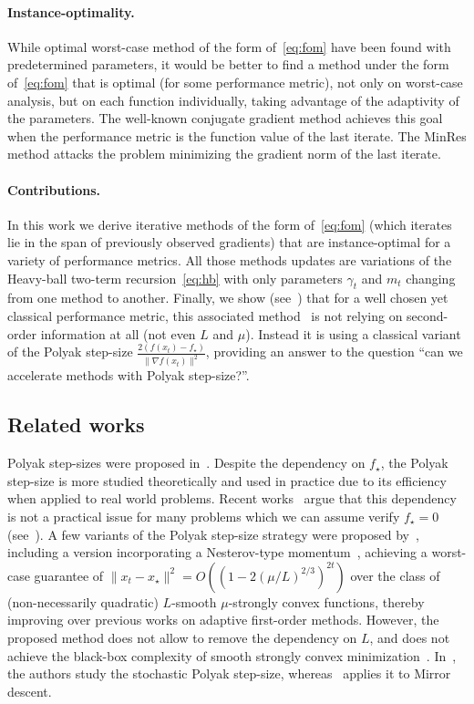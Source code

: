 \documentclass{article}
\newcommand{\xs}{x_\star}
\begin{document}
    \paragraph{Instance-optimality.}
    While optimal worst-case method of the form of~\cref{eq:fom} have been found with predetermined parameters,
    it would be better to find a method under the form of~\cref{eq:fom} that is optimal (for some performance metric),
    not only on worst-case analysis, but on each function individually, taking advantage of the adaptivity of the parameters.
    The well-known conjugate gradient method achieves this goal when the performance metric is the function value of the last iterate.
    The MinRes method attacks the problem minimizing the gradient norm of the last iterate.

    \paragraph{Contributions.}
    In this work we derive iterative methods of the form of~\cref{eq:fom} (which iterates lie in the span of previously observed gradients) that are instance-optimal for a variety of performance metrics.
    All those methods updates are variations of the Heavy-ball two-term recursion~\cref{eq:hb} with only parameters $\gamma_t$ and $m_t$ changing from one method to another.
    Finally, we show (see~) that for a well chosen yet classical performance metric, this associated method~ is not relying on second-order information at all (not even $L$ and $\mu$).
    Instead it is using a classical variant of the Polyak step-size $\frac{2(f(x_t) - f_\star)}{\|\nabla f(x_t)\|^2}$, providing an answer to the question ``can we accelerate methods with Polyak step-size?''.

\subsection{Related works}\label{subsec:related-works}

    Polyak step-sizes were proposed in~\citep{polyakintroduction}.
    Despite the dependency on $f_\star$, the Polyak step-size is more studied theoretically and used in practice due to its efficiency when applied to real world problems.
    Recent works~\citep[e.g.][]{loizou2021stochastic, d2021stochastic} argue that this dependency is not a practical issue for many problems which we can assume verify $f_\star=0$ (see~).
    A few variants of the Polyak step-size strategy were proposed by~\citet{barre2020complexity}, including a version incorporating a Nesterov-type momentum~\cite{nesterov1983method}, achieving a worst-case guarantee of $\|x_t - \xs\|^2 = O((1 - 2 (\mu/L)^{2/3})^{2t})$ over the class of (non-necessarily quadratic) $L$-smooth $\mu$-strongly convex functions, thereby improving over previous works on adaptive first-order methods.
    However, the proposed method does not allow to remove the dependency on $L$, and does not achieve the black-box complexity of smooth strongly convex minimization~\cite{nest-book-04}.
    In~\citep{loizou2021stochastic}, the authors study the stochastic Polyak step-size, whereas~\citep{d2021stochastic} applies it to Mirror descent.
\end{document}
